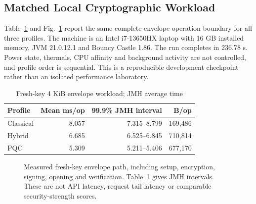 \documentclass[conference,a4paper]{IEEEtran}
\begin{document}
\subsection{Matched Local Cryptographic Workload}
Table~\ref{timing} and Fig.~\ref{cryptograph} report the same complete-envelope operation boundary for all three profiles. The machine is an Intel i7-13650HX laptop with 16 GB installed memory, JVM 21.0.12.1 and Bouncy Castle 1.86. The run completes in 236.78 s. Power state, thermals, CPU affinity and background activity are not controlled, and profile order is sequential. This is a reproducible development checkpoint rather than an isolated performance laboratory.

\begin{table}[t]
\caption{Fresh-key 4 KiB envelope workload; JMH average time}
\label{timing}\centering\footnotesize
\begin{tabular}{|l|r|r|r|}\hline
Profile & Mean ms/op & 99.9\% JMH interval & B/op\\\hline
Classical &8.057&7.315--8.799&169,486\\\hline
Hybrid &6.685&6.525--6.845&710,814\\\hline
PQC &5.309&5.211--5.406&677,170\\\hline
\end{tabular}
\end{table}

\begin{figure}[t]
\centering
{}
\caption{Measured fresh-key envelope path, including setup, encryption, signing, opening and verification. Table~\ref{timing} gives JMH intervals. These are not API latency, request tail latency or comparable security-strength scores.}
\label{cryptograph}
\end{figure}
\end{document}
